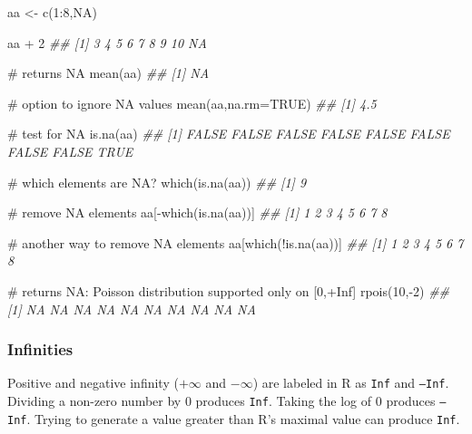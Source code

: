 \documentclass[
  13,
  letterpaper,
]{report}
\newenvironment{Shaded}{\begin{snugshade}}{\end{snugshade}}
\newcommand{\AttributeTok}[1]{\textcolor[rgb]{0.40,0.45,0.13}{#1}}
\newcommand{\CommentTok}[1]{\textcolor[rgb]{0.37,0.37,0.37}{#1}}
\newcommand{\ConstantTok}[1]{\textcolor[rgb]{0.56,0.35,0.01}{#1}}
\newcommand{\DecValTok}[1]{\textcolor[rgb]{0.68,0.00,0.00}{#1}}
\newcommand{\DocumentationTok}[1]{\textcolor[rgb]{0.37,0.37,0.37}{\textit{#1}}}
\newcommand{\FunctionTok}[1]{\textcolor[rgb]{0.28,0.35,0.67}{#1}}
\newcommand{\NormalTok}[1]{\textcolor[rgb]{0.00,0.23,0.31}{#1}}
\newcommand{\OtherTok}[1]{\textcolor[rgb]{0.00,0.23,0.31}{#1}}
\newcommand{\SpecialCharTok}[1]{\textcolor[rgb]{0.37,0.37,0.37}{#1}}
\begin{document}
\begin{Shaded}
\begin{Highlighting}[]
\NormalTok{aa }\OtherTok{\textless{}{-}} \FunctionTok{c}\NormalTok{(}\DecValTok{1}\SpecialCharTok{:}\DecValTok{8}\NormalTok{,}\ConstantTok{NA}\NormalTok{)}

\NormalTok{aa }\SpecialCharTok{+} \DecValTok{2}
\DocumentationTok{\#\# [1]  3  4  5  6  7  8  9 10 NA}

\CommentTok{\# returns NA}
\FunctionTok{mean}\NormalTok{(aa)}
\DocumentationTok{\#\# [1] NA}

\CommentTok{\# option to ignore NA values}
\FunctionTok{mean}\NormalTok{(aa,}\AttributeTok{na.rm=}\ConstantTok{TRUE}\NormalTok{)      }
\DocumentationTok{\#\# [1] 4.5}

\CommentTok{\# test for NA}
\FunctionTok{is.na}\NormalTok{(aa)               }
\DocumentationTok{\#\# [1] FALSE FALSE FALSE FALSE FALSE FALSE FALSE FALSE  TRUE}

\CommentTok{\# which elements are NA?}
\FunctionTok{which}\NormalTok{(}\FunctionTok{is.na}\NormalTok{(aa))        }
\DocumentationTok{\#\# [1] 9}

\CommentTok{\# remove NA elements}
\NormalTok{aa[}\SpecialCharTok{{-}}\FunctionTok{which}\NormalTok{(}\FunctionTok{is.na}\NormalTok{(aa))]   }
\DocumentationTok{\#\# [1] 1 2 3 4 5 6 7 8}

\CommentTok{\# another way to remove NA elements}
\NormalTok{aa[}\FunctionTok{which}\NormalTok{(}\SpecialCharTok{!}\FunctionTok{is.na}\NormalTok{(aa))]   }
\DocumentationTok{\#\# [1] 1 2 3 4 5 6 7 8}

\CommentTok{\# returns NA: Poisson distribution supported only on [0,+Inf]}
\FunctionTok{rpois}\NormalTok{(}\DecValTok{10}\NormalTok{,}\SpecialCharTok{{-}}\DecValTok{2}\NormalTok{) }
\DocumentationTok{\#\#  [1] NA NA NA NA NA NA NA NA NA NA}
\end{Highlighting}
\end{Shaded}

\subsubsection{Infinities}\label{sec-object-type-spec-inf}

Positive and negative infinity (\(+\infty\) and \(-\infty\)) are labeled
in R as \texttt{Inf} and \texttt{–Inf}. Dividing a non-zero number by 0
produces \texttt{Inf}. Taking the log of 0 produces \texttt{–Inf}.
Trying to generate a value greater than R's maximal value can produce
\texttt{Inf}.
\end{document}

